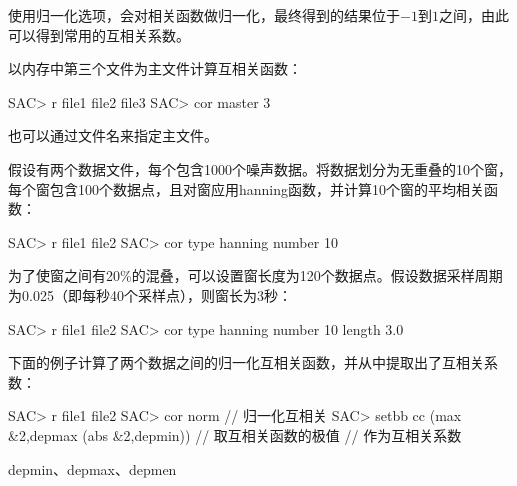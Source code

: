 使用归一化选项，会对相关函数做归一化，最终得到的结果位于$-1$到$1$之间，由此
可以得到常用的互相关系数。

以内存中第三个文件为主文件计算互相关函数：
\begin{SACCode}
SAC> r file1 file2 file3
SAC> cor master 3
\end{SACCode}
也可以通过文件名来指定主文件。

假设有两个数据文件，每个包含1000个噪声数据。将数据划分为无重叠的10个窗，
每个窗包含100个数据点，且对窗应用hanning函数，并计算10个窗的平均相关函数：
\begin{SACCode}
SAC> r file1 file2
SAC> cor type hanning number 10
\end{SACCode}

为了使窗之间有20\%的混叠，可以设置窗长度为120个数据点。假设数据采样周期
为0.025（即每秒40个采样点），则窗长为3秒：
\begin{SACCode}
SAC> r file1 file2
SAC> cor type hanning number 10 length 3.0
\end{SACCode}

下面的例子计算了两个数据之间的归一化互相关函数，并从中提取出了互相关系数：
\begin{SACCode}
SAC> r file1 file2
SAC> cor norm                                   // 归一化互相关
SAC> setbb cc (max &2,depmax (abs &2,depmin))   // 取互相关函数的极值
                                                // 作为互相关系数
\end{SACCode}

depmin、depmax、depmen
